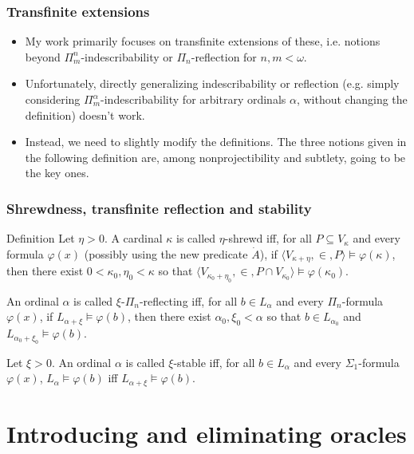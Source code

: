 \documentclass{beamer}
\begin{document}
\begin{frame}
\frametitle{Transfinite extensions}
\begin{itemize}
    \item My work primarily focuses on transfinite extensions of these, i.e. notions beyond $\Pi^n_m$-indescribability or $\Pi_n$-reflection for $n, m < \omega$.
    \item Unfortunately, directly generalizing indescribability or reflection (e.g. simply considering $\Pi^\alpha_m$-indescribability for arbitrary ordinals $\alpha$, without changing the definition) doesn't work.
    \item Instead, we need to slightly modify the definitions. The three notions given in the following definition are, among nonprojectibility and subtlety, going to be the key ones.
\end{itemize}
\end{frame}

\begin{frame}
\frametitle{Shrewdness, transfinite reflection and stability}
\begin{block}{Definition}
Let $\eta > 0$. A cardinal $\kappa$ is called $\eta$-shrewd iff, for all $P \subseteq V_\kappa$ and every formula $\varphi(x)$ (possibly using the new predicate $\dot{A}$), if $\langle V_{\kappa+\eta}, \in, P \rangle \models \varphi(\kappa)$, then there exist $0 < \kappa_0, \eta_0 < \kappa$ so that $\langle V_{\kappa_0+\eta_0}, \in, P \cap V_{\kappa_0} \rangle \models \varphi(\kappa_0)$.

An ordinal $\alpha$ is called $\xi$-$\Pi_n$-reflecting iff, for all $b \in L_\alpha$ and every $\Pi_n$-formula $\varphi(x)$, if $L_{\alpha+\xi} \models \varphi(b)$, then there exist $\alpha_0, \xi_0 < \alpha$ so that $b \in L_{\alpha_0}$ and $L_{\alpha_0+\xi_0} \models \varphi(b)$.

Let $\xi > 0$. An ordinal $\alpha$ is called $\xi$-stable iff, for all $b \in L_\alpha$ and every $\Sigma_1$-formula $\varphi(x)$, $L_\alpha \models \varphi(b)$ iff $L_{\alpha+\xi} \models \varphi(b)$.
\end{block}
\end{frame}

\section{Introducing and eliminating oracles}
\end{document}
